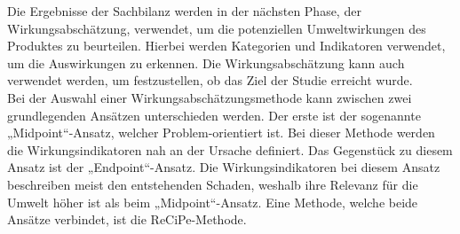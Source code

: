 Die Ergebnisse der Sachbilanz werden in der nächsten Phase, der Wirkungsabschätzung, verwendet, um die potenziellen Umweltwirkungen des Produktes zu beurteilen. Hierbei werden Kategorien und Indikatoren verwendet, um die Auswirkungen zu erkennen. Die Wirkungsabschätzung kann auch verwendet werden, um festzustellen, ob das Ziel der Studie erreicht wurde.\\
Bei der Auswahl einer Wirkungsabschätzungsmethode kann zwischen zwei grundlegenden Ansätzen unterschieden werden. Der erste ist der sogenannte „Midpoint“-Ansatz, welcher Problem-orientiert ist. Bei dieser Methode werden die Wirkungsindikatoren nah an der Ursache definiert. Das Gegenstück zu diesem Ansatz ist der „Endpoint“-Ansatz. Die Wirkungsindikatoren bei diesem Ansatz beschreiben meist den entstehenden Schaden, weshalb ihre Relevanz für die Umwelt höher ist als beim „Midpoint“-Ansatz. Eine Methode, welche beide Ansätze verbindet, ist die ReCiPe-Methode.